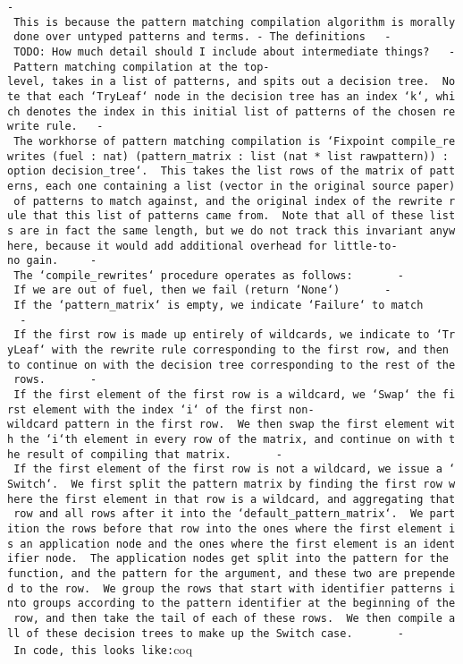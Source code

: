 \texttt{-\ This\ is\ because\ the\ pattern\ matching\ compilation\ algorithm\ is\ morally\ done\ over\ untyped\ patterns\ and\ terms.\ -\ The\ definitions\ \ \ -\ TODO:\ How\ much\ detail\ should\ I\ include\ about\ intermediate\ things?\ \ \ -\ Pattern\ matching\ compilation\ at\ the\ top-level,\ takes\ in\ a\ list\ of\ patterns,\ and\ spits\ out\ a\ decision\ tree.\ \ Note\ that\ each\ `TryLeaf`\ node\ in\ the\ decision\ tree\ has\ an\ index\ `k`,\ which\ denotes\ the\ index\ in\ this\ initial\ list\ of\ patterns\ of\ the\ chosen\ rewrite\ rule.\ \ \ -\ The\ workhorse\ of\ pattern\ matching\ compilation\ is\ `Fixpoint\ compile\_rewrites\textquotesingle{}\ (fuel\ :\ nat)\ (pattern\_matrix\ :\ list\ (nat\ *\ list\ rawpattern))\ :\ option\ decision\_tree`.\ \ This\ takes\ the\ list\ rows\ of\ the\ matrix\ of\ patterns,\ each\ one\ containing\ a\ list\ (vector\ in\ the\ original\ source\ paper)\ of\ patterns\ to\ match\ against,\ and\ the\ original\ index\ of\ the\ rewrite\ rule\ that\ this\ list\ of\ patterns\ came\ from.\ \ Note\ that\ all\ of\ these\ lists\ are\ in\ fact\ the\ same\ length,\ but\ we\ do\ not\ track\ this\ invariant\ anywhere,\ because\ it\ would\ add\ additional\ overhead\ for\ little-to-no\ gain.\ \ \ \ \ -\ The\ `compile\_rewrites\textquotesingle{}`\ procedure\ operates\ as\ follows:\ \ \ \ \ \ \ -\ If\ we\ are\ out\ of\ fuel,\ then\ we\ fail\ (return\ `None`)\ \ \ \ \ \ \ -\ If\ the\ `pattern\_matrix`\ is\ empty,\ we\ indicate\ `Failure`\ to\ match\ \ \ \ \ \ \ -\ If\ the\ first\ row\ is\ made\ up\ entirely\ of\ wildcards,\ we\ indicate\ to\ `TryLeaf`\ with\ the\ rewrite\ rule\ corresponding\ to\ the\ first\ row,\ and\ then\ to\ continue\ on\ with\ the\ decision\ tree\ corresponding\ to\ the\ rest\ of\ the\ rows.\ \ \ \ \ \ \ -\ If\ the\ first\ element\ of\ the\ first\ row\ is\ a\ wildcard,\ we\ `Swap`\ the\ first\ element\ with\ the\ index\ `i`\ of\ the\ first\ non-wildcard\ pattern\ in\ the\ first\ row.\ \ We\ then\ swap\ the\ first\ element\ with\ the\ `i`th\ element\ in\ every\ row\ of\ the\ matrix,\ and\ continue\ on\ with\ the\ result\ of\ compiling\ that\ matrix.\ \ \ \ \ \ \ -\ If\ the\ first\ element\ of\ the\ first\ row\ is\ not\ a\ wildcard,\ we\ issue\ a\ `Switch`.\ \ We\ first\ split\ the\ pattern\ matrix\ by\ finding\ the\ first\ row\ where\ the\ first\ element\ in\ that\ row\ is\ a\ wildcard,\ and\ aggregating\ that\ row\ and\ all\ rows\ after\ it\ into\ the\ `default\_pattern\_matrix`.\ \ We\ partition\ the\ rows\ before\ that\ row\ into\ the\ ones\ where\ the\ first\ element\ is\ an\ application\ node\ and\ the\ ones\ where\ the\ first\ element\ is\ an\ identifier\ node.\ \ The\ application\ nodes\ get\ split\ into\ the\ pattern\ for\ the\ function,\ and\ the\ pattern\ for\ the\ argument,\ and\ these\ two\ are\ prepended\ to\ the\ row.\ \ We\ group\ the\ rows\ that\ start\ with\ identifier\ patterns\ into\ groups\ according\ to\ the\ pattern\ identifier\ at\ the\ beginning\ of\ the\ row,\ and\ then\ take\ the\ tail\ of\ each\ of\ these\ rows.\ \ We\ then\ compile\ all\ of\ these\ decision\ trees\ to\ make\ up\ the\ Switch\ case.\ \ \ \ \ \ \ -\ In\ code,\ this\ looks\ like:}coq
